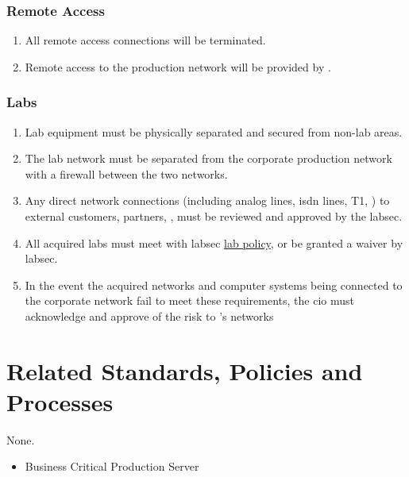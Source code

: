 \subsubsection{Remote Access}
\begin{enumerate}
\item
All remote access connections will be terminated. 
\item
Remote access to the production network will be provided by \CompanyName{}.
\end{enumerate}
\subsubsection{Labs}
\begin{enumerate}
\item 
Lab equipment must be physically separated and secured from non-lab areas. 
\item 
The lab network must be separated from the corporate production network with a firewall between the two networks. 
\item 
Any direct network connections (including analog lines, \gls{isdn} lines, T1, \etc) to external customers, partners, \etc, must be reviewed and approved by the \gls{labsec}.
\item 
All acquired labs must meet with \gls{labsec} \hyperref[SS:LSP]{lab policy}, or be granted a waiver by \gls{labsec}. 
\item 
In the event the acquired networks and computer systems being connected to the corporate network fail to meet these requirements, the \CompanyName{} \gls{cio} must acknowledge and approve of the risk to \CompanyName{}'s networks 
\end{enumerate}
\CommonPolicyCompliance
\section{Related Standards, Policies\oxford{} and Processes}
None.
\CommonDefinitionsAndTerms
\begin{itemize}
\item 
Business Critical Production Server
\end{itemize}
\CommonRevisionHistory